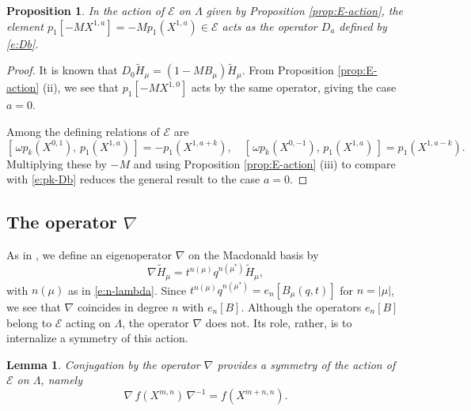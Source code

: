 \documentclass[12pt]{amsart}
\newtheorem{lemma}[thm]{Lemma}
\newtheorem{prop}[thm]{Proposition}
\theoremstyle{definition}
\theoremstyle{remark}
\newcommand{\Ecal}{{\mathcal E}}
\newcommand{\Htild}{\tilde{H}}
\begin{document}
\begin{prop}\label{prop:Db}
In the action of $\Ecal $ on $\Lambda $ given by Proposition
\ref{prop:E-action}, the element $p_{1}[-M X^{1,a}] = -M
p_{1}(X^{1,a})\in \Ecal $ acts as the operator $D_{a}$ defined by
\eqref{e:Db}.
\end{prop}

\begin{proof}
It is known \cite[Proposition 2.4]{Haiman99} that $D_{0}\Htild _{\mu }
= (1-MB_{\mu })\Htild _{\mu }$.  From Proposition \ref{prop:E-action}
(ii), we see that $p_{1}[-M X^{1,0}]$ acts by the same operator,
giving the case $a=0$.  

Among the defining relations of $\Ecal $ are
\begin{equation}\label{e:E-commutators}
[\, \omega p_{k}(X^{0,1}),\, p_{1}(X^{1,a})\, ] = -
p_{1}(X^{1,a+k}),\quad [\, \omega p_{k}(X^{0,-1}),\, p_{1}(X^{1,a})\,
] = p_{1}(X^{1,a-k}).
\end{equation}
Multiplying these by $-M$ and using Proposition \ref{prop:E-action}
(iii) to compare with \eqref{e:pk-Db} reduces the general result to
the case $a=0$.
\end{proof}


\subsection{The operator \texorpdfstring{$\nabla $}{\textnabla}}
\label{ss:nabla}

As in \cite{BeGaHaTe99}, we define an eigenoperator 
$\nabla $ on the
Macdonald basis by
\begin{equation}\label{e:nabla}
\nabla \Htild _{\mu } = t^{n(\mu )}q^{n(\mu ^{*})} \Htild _{\mu },
\end{equation}
with $n(\mu )$ as in \eqref{e:n-lambda}.  Since $t^{n(\mu )}q^{n(\mu
^{*})} = e_{n}[B_{\mu }(q,t)]$ for $n = |\mu |$, we see that $\nabla $
coincides in degree $n$ with $e_{n}[B]$.  Although the operators
$e_{n}[B]$ belong to $\Ecal $ acting on $\Lambda $, the operator
$\nabla $ does not.  Its role, rather, is to internalize a symmetry of
this action.

\begin{lemma}\label{lem:nabla-sym}
Conjugation by the operator $\nabla $ provides a symmetry of the
action of $\Ecal $ on $\Lambda $, namely
\begin{equation}\label{e:nabla-sym}
\nabla\, f(X^{m,n})\, \nabla^{-1} = f(X^{m+n,n}).
\end{equation}
\end{lemma}
\end{document}

